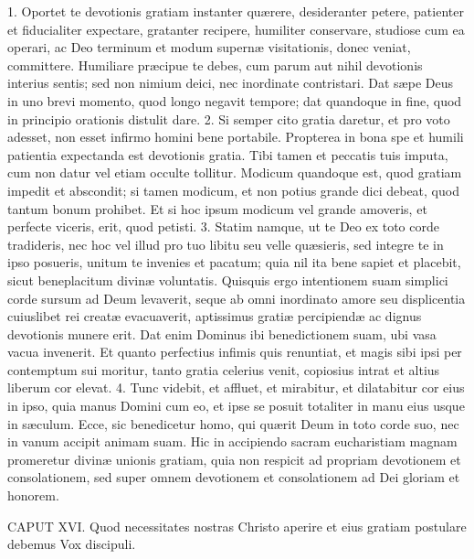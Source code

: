 1. Oportet te devotionis gratiam instanter quærere, desideranter petere, patienter et fiducialiter expectare, gratanter recipere, humiliter conservare, studiose cum ea operari, ac Deo terminum et modum supernæ visitationis, donec veniat, committere. Humiliare præcipue te debes, cum parum aut nihil devotionis interius sentis; sed non nimium deici, nec inordinate contristari. Dat sæpe Deus in uno brevi momento, quod longo negavit tempore; dat quandoque in fine, quod in principio orationis distulit dare.
2. Si semper cito gratia daretur, et pro voto adesset, non esset infirmo homini bene portabile. Propterea in bona spe et humili patientia expectanda est devotionis gratia. Tibi tamen et peccatis tuis imputa, cum non datur vel etiam occulte tollitur. Modicum quandoque est, quod gratiam impedit et abscondit; si tamen modicum, et non potius grande dici debeat, quod tantum bonum prohibet. Et si hoc ipsum modicum vel grande amoveris, et perfecte viceris, erit, quod petisti.
3. Statim namque, ut te Deo ex toto corde tradideris, nec hoc vel illud pro tuo libitu seu velle quæsieris, sed integre te in ipso posueris, unitum te invenies et pacatum; quia nil ita bene sapiet et placebit, sicut beneplacitum divinæ voluntatis. Quisquis ergo intentionem suam simplici corde sursum ad Deum levaverit, seque ab omni inordinato amore seu displicentia cuiuslibet rei creatæ evacuaverit, aptissimus gratiæ percipiendæ ac dignus devotionis munere erit. Dat enim Dominus ibi benedictionem suam, ubi vasa vacua invenerit. Et quanto perfectius infimis quis renuntiat, et magis sibi ipsi per contemptum sui moritur, tanto gratia celerius venit, copiosius intrat et altius liberum cor elevat.
4. Tunc videbit, et affluet, et mirabitur, et dilatabitur cor eius in ipso, quia manus Domini cum eo, et ipse se posuit totaliter in manu eius usque in sæculum. Ecce, sic benedicetur homo, qui quærit Deum in toto corde suo, nec in vanum accipit animam suam. Hic in accipiendo sacram eucharistiam magnam promeretur divinæ unionis gratiam, quia non respicit ad propriam devotionem et consolationem, sed super omnem devotionem et consolationem ad Dei gloriam et honorem.


CAPUT XVI.
Quod necessitates nostras Christo aperire et eius gratiam postulare debemus
Vox discipuli.


